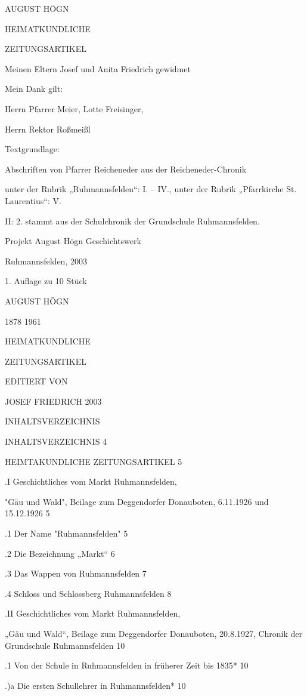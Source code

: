 \documentclass{book}
\begin{document}
AUGUST HÖGN

HEIMATKUNDLICHE

ZEITUNGSARTIKEL

Meinen Eltern Josef und Anita Friedrich gewidmet


Mein Dank gilt:

Herrn Pfarrer Meier, Lotte Freisinger,

Herrn Rektor Roßmeißl


Textgrundlage:

Abschriften von Pfarrer Reicheneder aus der Reicheneder-Chronik

unter der Rubrik „Ruhmannsfelden“: I. – IV., unter der Rubrik „Pfarrkirche St.
Laurentius“: V.

II: 2. stammt aus der Schulchronik der Grundschule Ruhmannsfelden.


Projekt August Högn Geschichtswerk

Ruhmannsfelden, 2003

1. Auflage zu 10 Stück

AUGUST HÖGN

1878 1961


HEIMATKUNDLICHE

ZEITUNGSARTIKEL



EDITIERT VON

JOSEF FRIEDRICH 2003



INHALTSVERZEICHNIS

INHALTSVERZEICHNIS  4

HEIMTAKUNDLICHE ZEITUNGSARTIKEL 5

.I Geschichtliches vom Markt Ruhmannsfelden,

"Gäu und Wald", Beilage zum Deggendorfer Donauboten, 6.11.1926 und 15.12.1926
5

.1 Der Name "Ruhmannsfelden"    5

.2 Die Bezeichnung „Markt“  6

.3 Das Wappen von Ruhmannsfelden    7

.4 Schloss und Schlossberg Ruhmannsfelden   8

.II Geschichtliches vom Markt Ruhmannsfelden,

„Gäu und Wald“, Beilage zum Deggendorfer Donauboten, 20.8.1927, Chronik der
Grundschule Ruhmannsfelden  10

.1 Von der Schule in Ruhmannsfelden in früherer Zeit bis 1835*  10

.)a Die ersten Schullehrer in Ruhmannsfelden*   10
\end{document}
